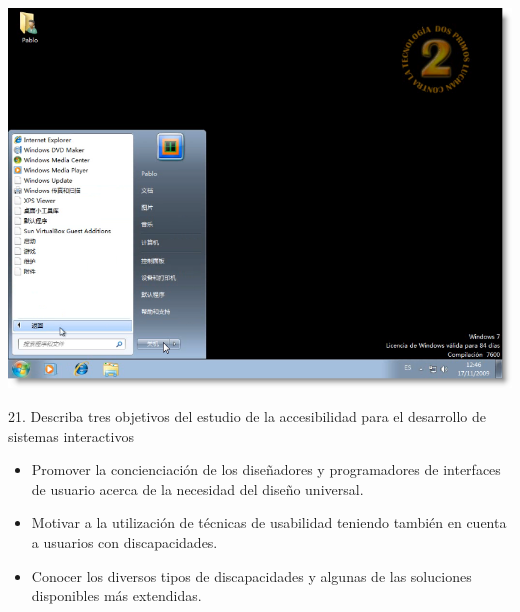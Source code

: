 \documentclass{beamer}
\begin{document}
\begin{frame}
 \begin{center}
\includegraphics[scale = 0.4]{13.png}
\end{center}
\end{frame}

\begin{frame}
\begin{block}{21. Describa tres objetivos del estudio de la accesibilidad para el desarrollo de sistemas interactivos}
\begin{itemize}
 \item Promover la concienciación de los diseñadores y programadores de interfaces de usuario acerca de la necesidad del diseño universal.
 \item Motivar a la utilización de técnicas de usabilidad teniendo también en cuenta a usuarios
con discapacidades.
 \item Conocer los diversos tipos de discapacidades y algunas de las soluciones disponibles
más extendidas.
\end{itemize}
\end{block}
\end{frame}
\end{document}
